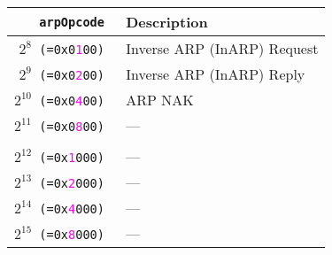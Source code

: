 \documentclass[documentation]{subfiles}
\begin{document}
\begin{minipage}{.48\textwidth}
    \begin{longtable}{>{\tt}rl}
        \toprule
        {\bf arpOpcode} & {\bf Description}\\
        \midrule\endhead%
        $2^{8}$  (=0x0\textcolor{magenta}{1}00) & Inverse ARP (InARP) Request\\
        $2^{9}$  (=0x0\textcolor{magenta}{2}00) & Inverse ARP (InARP) Reply\\
        $2^{10}$ (=0x0\textcolor{magenta}{4}00) & ARP NAK\\
        $2^{11}$ (=0x0\textcolor{magenta}{8}00) & ---\\
        \\
        $2^{12}$ (=0x\textcolor{magenta}{1}000) & ---\\
        $2^{13}$ (=0x\textcolor{magenta}{2}000) & ---\\
        $2^{14}$ (=0x\textcolor{magenta}{4}000) & ---\\
        $2^{15}$ (=0x\textcolor{magenta}{8}000) & ---\\
        \bottomrule
    \end{longtable}
\end{minipage}
\end{document}

